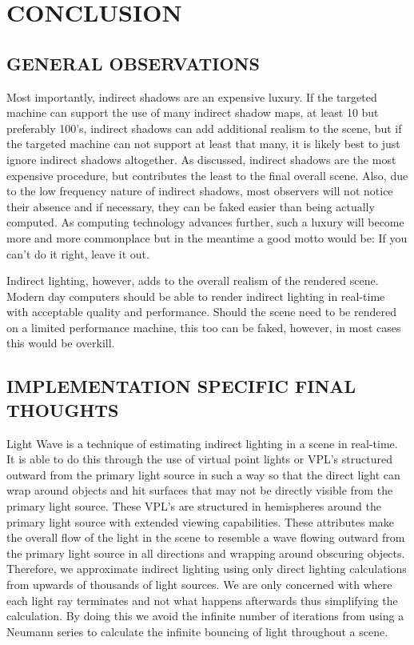 \chapter{CONCLUSION}

\section{GENERAL OBSERVATIONS}
Most importantly, indirect shadows are an expensive luxury.  If the targeted machine can support the use of many indirect shadow maps, at least 10 but preferably 100's, indirect shadows can add additional realism to the scene, but if the targeted machine can not support at least that many, it is likely best to just ignore indirect shadows altogether.  As discussed, indirect shadows are the most expensive procedure, but contributes the least to the final overall scene.  Also, due to the low frequency nature of indirect shadows, most observers will not notice their absence and if necessary, they can be faked easier than being actually computed.  As computing technology advances further, such a luxury will become more and more commonplace but in the meantime a good motto would be: If you can't do it right, leave it out.

Indirect lighting, however, adds to the overall realism of the rendered scene.  Modern day computers should be able to render indirect lighting in real-time with acceptable quality and performance.  Should the scene need to be rendered on a limited performance machine, this too can be faked, however, in most cases this would be overkill.

\section{IMPLEMENTATION SPECIFIC FINAL THOUGHTS}
Light Wave is a technique of estimating indirect lighting in a scene in real-time.  It is able to do this through the use of virtual point lights or VPL's structured outward from the primary light source in such a way so that the direct light can wrap around objects and hit surfaces that may not be directly visible from the primary light source.  These VPL's are structured in hemispheres around the primary light source with extended viewing capabilities.  These attributes make the overall flow of the light in the scene to resemble a wave flowing outward from the primary light source in all directions and wrapping around obscuring objects.  Therefore, we approximate indirect lighting using only direct lighting calculations from upwards of thousands of light sources.  We are only concerned with where each light ray terminates and not what happens afterwards thus simplifying the calculation.  By doing this we avoid the infinite number of iterations from using a Neumann series to calculate the infinite bouncing of light throughout a scene.


